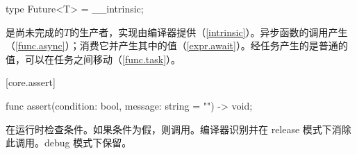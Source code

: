 \begin{itemdecl}
type Future<T> = __intrinsic;
\end{itemdecl}

\pnum
{}是尚未完成的$T$的生产者，实现由编译器提供（\ref{intrinsic}）。异步函数的调用产生（\ref{func.async}）；消费它并产生其中的值（\ref{expr.await}）。经任务产生的是普通的值，可以在任务之间移动（\ref{func.task}）。

[core.assert]{}

\begin{itemdecl}
func assert(condition: bool, message: string = "") -> void;
\end{itemdecl}

\pnum
{}在运行时检查条件。如果条件为假，则调用。编译器识别并在 release 模式下消除此调用。debug 模式下保留。